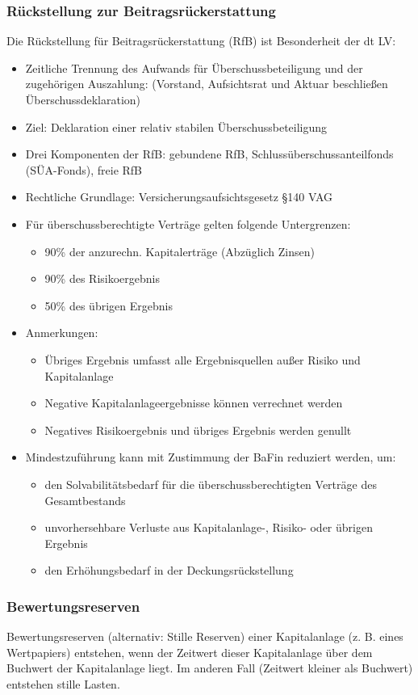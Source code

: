 \documentclass[12pt]{report}
\theoremstyle{dotless}
\theoremstyle{definition}
\begin{document}
\subsubsection{Rückstellung zur Beitragsrückerstattung}
Die Rückstellung für Beitragsrückerstattung (RfB) ist Besonderheit der dt LV:
\begin{itemize}
\item Zeitliche Trennung des Aufwands für Überschussbeteiligung und der zugehörigen Auszahlung: (Vorstand, Aufsichtsrat und Aktuar beschließen Überschussdeklaration)
\item Ziel: Deklaration einer relativ stabilen Überschussbeteiligung
\item Drei Komponenten der RfB: gebundene RfB, Schlussüberschussanteilfonds (SÜA-Fonds), freie RfB
\item Rechtliche Grundlage: Versicherungsaufsichtsgesetz §140 VAG
\item Für überschussberechtigte Verträge gelten folgende Untergrenzen:
\begin{itemize}
\item 90\% der anzurechn. Kapitalerträge (Abzüglich Zinsen)
\item 90\% des Risikoergebnis
\item 50\% des übrigen Ergebnis
\end{itemize}
\item Anmerkungen:
\begin{itemize}
\item Übriges Ergebnis umfasst alle Ergebnisquellen außer Risiko und Kapitalanlage
\item Negative Kapitalanlageergebnisse können verrechnet werden
\item Negatives Risikoergebnis und übriges Ergebnis werden genullt
\end{itemize}
\item Mindestzuführung kann mit Zustimmung der BaFin reduziert werden, um:
\begin{itemize}
\item den Solvabilitätsbedarf für die überschussberechtigten Verträge des Gesamtbestands
\item unvorhersehbare Verluste aus Kapitalanlage-, Risiko- oder übrigen Ergebnis
\item den Erhöhungsbedarf in der Deckungsrückstellung
\end{itemize}
\end{itemize}

\subsubsection{Bewertungsreserven}
Bewertungsreserven (alternativ: Stille Reserven) einer Kapitalanlage (z. B. eines Wertpapiers) entstehen, wenn der Zeitwert dieser Kapitalanlage
über dem Buchwert der Kapitalanlage liegt. Im anderen Fall (Zeitwert kleiner
als Buchwert) entstehen stille Lasten.
\end{document}
